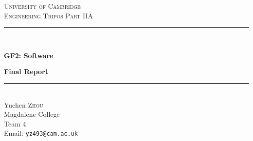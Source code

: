 \begin{titlepage}
	\newcommand{\HRule}{\rule{\linewidth}{0.5mm}} %
	
	\center %
	
	
	\textsc{\LARGE University of Cambridge}\\[0.4cm]
	\textsc{\LARGE Engineering Tripos Part IIA}\\[1.5cm]
	
	
	\HRule\\[0.4cm]
	
  \begin{center}
    \huge\bfseries GF2: Software\\[0.8cm]
  \end{center}

	{\LARGE\bfseries Final Report}\\[0.4cm] %
	
	\HRule\\[1.5cm]
	
	
	
  {\Large
	  Yuchen \textsc{Zhou}\\ %
    Magdalene College\\
    Team 4\\[1.5cm]
    Email: \texttt{yz493@cam.ac.uk}
  }


\end{titlepage}
